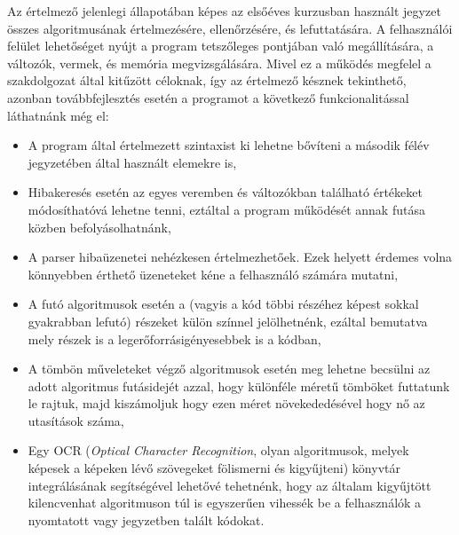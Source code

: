 Az értelmező jelenlegi állapotában képes az elsőéves kurzusban használt jegyzet\cite{jegyzet} összes algoritmusának értelmezésére, ellenőrzésére, és lefuttatására. A felhasználói felület lehetőséget nyújt a program tetszőleges pontjában való megállítására, a változók, vermek, és memória megvizsgálására. Mivel ez a működés megfelel a szakdolgozat által kitűzött céloknak, így az értelmező késznek tekinthető, azonban továbbfejlesztés esetén a programot a következő funkcionalitással láthatnánk még el:

\begin{itemize}
    \item A program által értelmezett szintaxist ki lehetne bővíteni a második félév jegyzetében által használt elemekre is,
    \item Hibakeresés esetén az egyes veremben és változókban található értékeket módosíthatóvá lehetne tenni, eztáltal a program működését annak futása közben befolyásolhatnánk,
    \item A parser hibaüzenetei nehézkesen értelmezhetőek. Ezek helyett érdemes volna könnyebben érthető üzeneteket kéne a felhasználó számára mutatni,
    \item A futó algoritmusok esetén a  (vagyis a kód többi részéhez képest sokkal gyakrabban lefutó) részeket külön színnel jelölhetnénk, ezáltal bemutatva mely részek is a legerőforrásigényesebbek is a kódban,
    \item A tömbön műveleteket végző algoritmusok esetén meg lehetne becsülni az adott algoritmus futásidejét azzal, hogy különféle méretű tömböket futtatunk le rajtuk, majd kiszámoljuk hogy ezen méret növekededésével hogy nő az utasítások száma,
    \item Egy OCR (\textit{Optical Character Recognition}, olyan algoritmusok, melyek képesek a képeken lévő szövegeket fölismerni és kigyűjteni) könyvtár integrálásának segítségével lehetővé tehetnénk, hogy az általam kigyűjtött kilencvenhat algoritmuson túl is egyszerűen vihessék be a felhasználók a nyomtatott vagy jegyzetben talált kódokat.
\end{itemize}